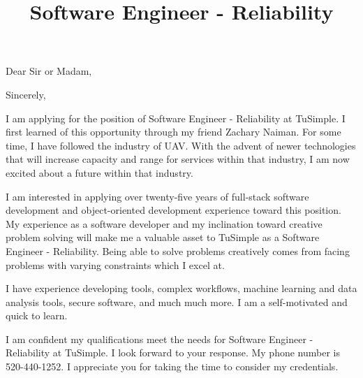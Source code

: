 \documentclass[11pt,a4paper,sans]{moderncv}        %
\title{Software Engineer - Reliability}                               %
\begin{document}
\opening{Dear Sir or Madam,}
\closing{Sincerely,}
\makelettertitle


I am applying for the position of Software Engineer - Reliability at TuSimple. I first learned of this opportunity through my friend Zachary Naiman. 
For some time, I have followed the industry of UAV. With the advent of newer technologies that will increase capacity and range for services within
that industry, I am now excited about a future within that industry.

I am interested in applying over twenty-five years of full-stack software development and object-oriented development experience toward this position.
My experience as a software developer and my inclination toward creative problem solving will make me a valuable asset to TuSimple as a Software Engineer
 - Reliability. Being able to solve problems creatively comes from facing problems with varying constraints which I excel at.

I have experience developing tools, complex workflows, machine learning and data analysis tools, secure software, and much much more. I am a self-motivated
and quick to learn.

I am confident my qualifications meet the needs for Software Engineer - Reliability at TuSimple. I look forward to your response. My phone number is 520-440-1252.
I appreciate you for taking the time to consider my credentials.


\makeletterclosing
\end{document}
